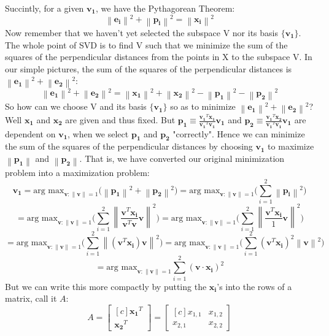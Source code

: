 \documentclass{tufte-handout}
\newcommand{\norm}[1]{\left\lVert#1\right\rVert}
\begin{document}
Succintly, for a given $\mathbf{v_1}$, we have the Pythagorean Theorem:
\[
\norm{\mathbf{e_i}}^2+\norm{\mathbf{p_i}}^2
=\norm{\mathbf{x_i}}^2
\]
Now remember that we haven't yet selected the subspace V nor its basis $\{\mathbf{v_1}\}$. The whole point of SVD is to find V such that we minimize the sum of the squares of the perpendicular distances from the points in X to the subspace V. In our simple pictures, the sum of the squares of the perpendicular distances is $\norm{\mathbf{e_1}}^2+\norm{\mathbf{e_2}}^2$:
\[
\norm{\mathbf{e_1}}^2+\norm{\mathbf{e_2}}^2
=
\norm{\mathbf{x_1}}^2+\norm{\mathbf{x_2}}^2
-
\norm{\mathbf{p_1}}^2-\norm{\mathbf{p_2}}^2
\]
So how can we choose V and its basis $\{\mathbf{v_1}\}$ so as to minimize $\norm{\mathbf{e_1}}^2+\norm{\mathbf{e_2}}^2$? Well $\mathbf{x_1}$ and $\mathbf{x_2}$ are given and thus fixed. But $\mathbf{p_1} \equiv\frac{\mathbf{v_1}^T\mathbf{x_1}} {\mathbf{v_1}^T\mathbf{v_1}}\mathbf{v_1}$ and $\mathbf{p_2} \equiv\frac{\mathbf{v_1}^T\mathbf{x_2}} {\mathbf{v_1}^T\mathbf{v_1}}\mathbf{v_1}$ are dependent on $\mathbf{v_1}$, when we select $\mathbf{p_1}$ and $\mathbf{p_2}$ "correctly". Hence we can minimize the sum of the squares of the perpendicular distances by choosing $\mathbf{v_1}$ to maximize $\norm{\mathbf{p_1}}$ and $\norm{\mathbf{p_2}}$. That is, we have converted our original minimization problem into a maximization problem:
\[
\mathbf{v_1}
=
\text{arg max}_
{\mathbf{v}:\norm{\mathbf{v}}=1}\Big(\norm{\mathbf{p_1}}^2+\norm{\mathbf{p_2}}^2\Big)
=
\text{arg max}_
{\mathbf{v}:\norm{\mathbf{v}}=1}\Big(\sum_{i=1}^{2}\norm{\mathbf{p_i}}^2\Big)
\]
\[
=
\text{arg max}_
{\mathbf{v}:\norm{\mathbf{v}}=1}\Big(\sum_{i=1}^{2}\norm{\frac{\mathbf{v}^T\mathbf{x_i}} {\mathbf{v}^T\mathbf{v}}\mathbf{v}}^2\Big)
=
\text{arg max}
_{\mathbf{v}:\norm{\mathbf{v}}=1}\Big(\sum_{i=1}^{2}\norm{\frac{\mathbf{v}^T\mathbf{x_i}} {1}\mathbf{v}}^2\Big)
\]
\[
=
\text{arg max}
_{\mathbf{v}:\norm{\mathbf{v}}=1}\Big(\sum_{i=1}^{2}\norm{(\mathbf{v}^T\mathbf{x_i})\mathbf{v}}^2\Big)
=
\text{arg max}
_{\mathbf{v}:\norm{\mathbf{v}}=1}\Big(\sum_{i=1}^{2}(\mathbf{v}^T\mathbf{x_i})^2\norm{\mathbf{v}}^2\Big)
\]
\[
=
\text{arg max}
_{\mathbf{v}:\norm{\mathbf{v}}=1}\sum_{i=1}^{2}(\mathbf{v}\cdot\mathbf{x_i})^2
\]
But we can write this more compactly by putting the $\mathbf{x_i}$'s into the rows of a matrix, call it $A$:
\[
A=
\begin{bmatrix*}[c]
\mathbf{x_1}^T\\ \mathbf{x_2}^T
\end{bmatrix*}
=
\begin{bmatrix*}[c]
x_{1,1}&x_{1,2}\\
x_{2,1}&x_{2,2}
\end{bmatrix*}
\]
\end{document}
